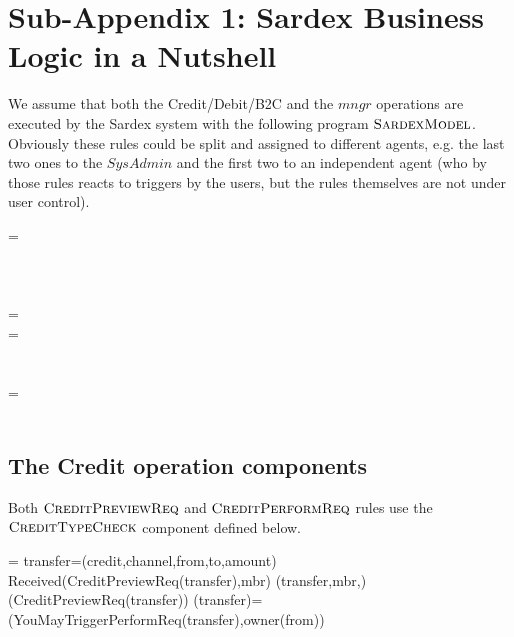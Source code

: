 \section{Sub-Appendix 1: Sardex Business Logic in a Nutshell}
\label{sect:appendixModel}

We assume that both the Credit/Debit/B2C and the $mngr$ operations are executed by the Sardex system with the following program $\hbox{\sc SardexModel}$. Obviously these rules could be split and assigned to different agents, e.g. the last two ones to the $SysAdmin$ and the first two to an independent agent (who by those rules reacts to triggers by the users, but the rules themselves are not under user control).

\begin{asm}
 =\+
  \\
  \\
  \\
  \\
   \-
\WHERE \+
  =\+
      \\
      \-
  =\+
      \\
      \\
     \\
     \-
   =\+    
     	\\
     	\\
 \end{asm}
 
 \subsection{The Credit operation components}
 
 Both $\hbox{\sc CreditPreviewReq}$ and $ \hbox{\sc CreditPerformReq}$ rules use the $ \hbox{\sc CreditTypeCheck}$ component defined below.
 
 \begin{asm}
  =\+
    \LET transfer=(credit,channel,from,to,amount)\+
        \IF Received(CreditPreviewReq(transfer),\FROM mbr) \THEN \+   
           (transfer,mbr,)\\
            (CreditPreviewReq(transfer)) \-
      \WHERE \+
         (transfer)=\+
        (YouMayTriggerPerformReq(transfer),\TO owner(from))
 \end{asm}
 
